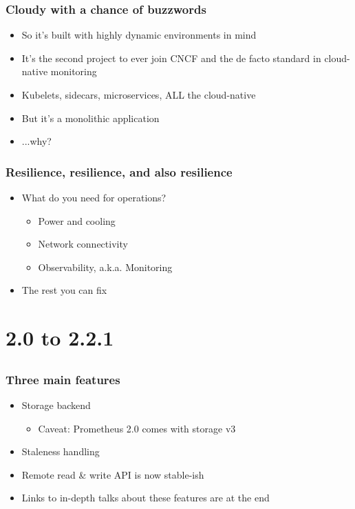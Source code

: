 \documentclass[aspectratio=169]{beamer}
\begin{document}
\begin{frame}
	\frametitle{Cloudy with a chance of buzzwords}
	\begin{itemize}
		\item So it's built with highly dynamic environments in mind
		\item It's the second project to ever join CNCF and the de facto standard in cloud-native monitoring
		\item Kubelets, sidecars, microservices, ALL the cloud-native
		\vfill
		\item But it's a monolithic application
		\vfill
		\item ...why?
	\end{itemize}
\end{frame}

\begin{frame}
	\frametitle{Resilience, resilience, and also resilience}
	\begin{itemize}
		\item What do you need for operations?
		\begin{itemize}
			\item Power and cooling
			\item Network connectivity
			\item Observability, a.k.a. Monitoring
		\end{itemize}
		\item The rest you can fix
	\end{itemize}
\end{frame}


\section{2.0 to 2.2.1}
\subsection{}

\begin{frame}
	\frametitle{Three main features}
	\begin{itemize}
		\item Storage backend
		\begin{itemize}
			\item Caveat: Prometheus 2.0 comes with storage v3
		\end{itemize}
		\item Staleness handling
		\item Remote read \& write API is now stable-ish
		\item Links to in-depth talks about these features are at the end
	\end{itemize}
\end{frame}
\end{document}
